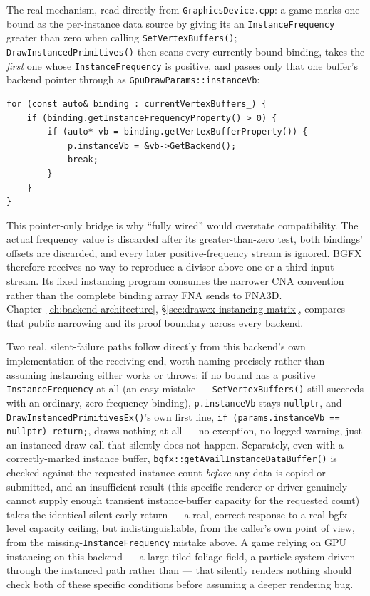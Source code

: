 The real mechanism, read directly from \texttt{GraphicsDevice.cpp}: a game marks one bound
 as the per-instance data source by giving its
 an \texttt{InstanceFrequency} greater than zero when calling
\texttt{SetVertexBuffers()}; \texttt{DrawInstancedPrimitives()} then scans every currently
bound binding, takes the \emph{first} one whose \texttt{InstanceFrequency} is positive, and
passes only that one buffer's backend pointer through as \texttt{GpuDrawParams::instanceVb}:

\begin{lstlisting}
for (const auto& binding : currentVertexBuffers_) {
    if (binding.getInstanceFrequencyProperty() > 0) {
        if (auto* vb = binding.getVertexBufferProperty()) {
            p.instanceVb = &vb->GetBackend();
            break;
        }
    }
}
\end{lstlisting}

This pointer-only bridge is why ``fully wired'' would overstate compatibility. The actual
frequency value is discarded after its greater-than-zero test, both bindings' offsets are
discarded, and every later positive-frequency stream is ignored. BGFX therefore receives no
way to reproduce a divisor above one or a third input stream. Its fixed instancing program
consumes the narrower CNA convention rather than the complete binding array FNA sends to
FNA3D. Chapter~\ref{ch:backend-architecture},
\S\ref{sec:drawex-instancing-matrix}, compares that public narrowing and its proof boundary
across every backend.

Two real, silent-failure paths follow directly from this backend's own implementation of the
receiving end, worth naming precisely rather than assuming instancing either works or throws:
if no bound  has a positive \texttt{InstanceFrequency} at all
(an easy mistake --- \texttt{SetVertexBuffers()} still succeeds with an ordinary,
zero-frequency binding), \texttt{p.instanceVb} stays \texttt{nullptr}, and
\texttt{DrawInstancedPrimitivesEx()}'s own first line, \texttt{if (params.instanceVb ==
nullptr) return;}, draws nothing at all --- no exception, no logged warning, just an
instanced draw call that silently does not happen. Separately, even with a correctly-marked
instance buffer, \texttt{bgfx::getAvailInstanceDataBuffer()} is checked against the requested
instance count \emph{before} any data is copied or submitted, and an insufficient result
(this specific renderer or driver genuinely cannot supply enough transient instance-buffer
capacity for the requested count) takes the identical silent early return --- a real, correct
response to a real bgfx-level capacity ceiling, but indistinguishable, from the caller's own
point of view, from the missing-\texttt{InstanceFrequency} mistake above. A game relying on
GPU instancing on this backend --- a large tiled foliage field, a particle system driven
through the instanced path rather than  --- that silently renders
nothing should check both of these specific conditions before assuming a deeper rendering
bug.

